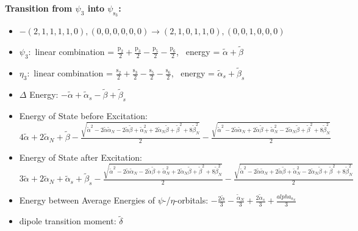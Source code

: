 \documentclass[12pt,a4paper]{article}
\begin{document}
        \noindent\textbf{Transition from $\psi_{3}$ into $\psi_{\text{s}_{3}}$:}
        \begin{itemize}
            \item $- (2, 1, 1, 1, 1, 0), (0, 0, 0, 0, 0, 0) \rightarrow (2, 1, 0, 1, 1, 0), (0, 0, 1, 0, 0, 0)$
        
            \item $\psi_{3}:$ linear combination = $\frac{\text{p}_{2}}{2} + \frac{\text{p}_{3}}{2} - \frac{\text{p}_{5}}{2} - \frac{\text{p}_{6}}{2}$, \
            energy = $\tilde{\alpha} + \tilde{\beta}$
            
            \item $\eta_{3}:$ linear combination = $\frac{\text{s}_{2}}{2} + \frac{\text{s}_{3}}{2} - \frac{\text{s}_{5}}{2} - \frac{\text{s}_{6}}{2}$, \
            energy = $\tilde{\alpha}_{s} + \tilde{\beta}_{s}$
            
                \item $\Delta$ Energy: $- \tilde{\alpha} + \tilde{\alpha}_{s} - \tilde{\beta} + \tilde{\beta}_{s}$
                \item Energy of State before Excitation: $4 \tilde{\alpha} + 2 \tilde{\alpha}_{N} + \tilde{\beta} - \frac{\sqrt{\tilde{\alpha}^{2} - 2 \tilde{\alpha} \tilde{\alpha}_{N} - 2 \tilde{\alpha} \tilde{\beta} + \tilde{\alpha}_{N}^{2} + 2 \tilde{\alpha}_{N} \tilde{\beta} + \tilde{\beta}^{2} + 8 \tilde{\beta}_{N}^{2}}}{2} - \frac{\sqrt{\tilde{\alpha}^{2} - 2 \tilde{\alpha} \tilde{\alpha}_{N} + 2 \tilde{\alpha} \tilde{\beta} + \tilde{\alpha}_{N}^{2} - 2 \tilde{\alpha}_{N} \tilde{\beta} + \tilde{\beta}^{2} + 8 \tilde{\beta}_{N}^{2}}}{2}$
                \item Energy of State after Excitation: $3 \tilde{\alpha} + 2 \tilde{\alpha}_{N} + \tilde{\alpha}_{s} + \tilde{\beta}_{s} - \frac{\sqrt{\tilde{\alpha}^{2} - 2 \tilde{\alpha} \tilde{\alpha}_{N} - 2 \tilde{\alpha} \tilde{\beta} + \tilde{\alpha}_{N}^{2} + 2 \tilde{\alpha}_{N} \tilde{\beta} + \tilde{\beta}^{2} + 8 \tilde{\beta}_{N}^{2}}}{2} - \frac{\sqrt{\tilde{\alpha}^{2} - 2 \tilde{\alpha} \tilde{\alpha}_{N} + 2 \tilde{\alpha} \tilde{\beta} + \tilde{\alpha}_{N}^{2} - 2 \tilde{\alpha}_{N} \tilde{\beta} + \tilde{\beta}^{2} + 8 \tilde{\beta}_{N}^{2}}}{2}$
                \item Energy between Average Energies of $\psi$-/$\eta$-orbitals: $- \frac{2 \tilde{\alpha}}{3} - \frac{\tilde{\alpha}_{N}}{3} + \frac{2 \tilde{\alpha}_{s}}{3} + \frac{alpha_{\text{s}_N}}{3}$
            
            \item dipole transition moment: $\tilde{\delta}$
        
        \end{itemize}
        
\end{document}
